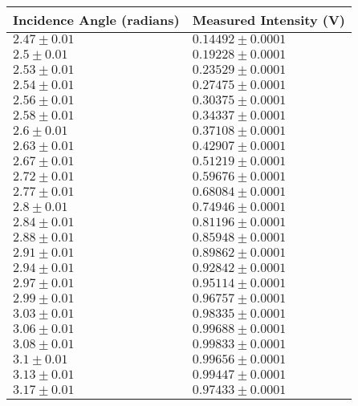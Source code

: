 \begin{tabular}{| p{} | p{} |}
\hline
Incidence Angle (radians) & Measured Intensity (V)\\
\hline
$2.47 \pm 0.01$ & $0.14492 \pm 0.0001$\\
$2.5 \pm 0.01$ & $0.19228 \pm 0.0001$\\
$2.53 \pm 0.01$ & $0.23529 \pm 0.0001$\\
$2.54 \pm 0.01$ & $0.27475 \pm 0.0001$\\
$2.56 \pm 0.01$ & $0.30375 \pm 0.0001$\\
$2.58 \pm 0.01$ & $0.34337 \pm 0.0001$\\
$2.6 \pm 0.01$ & $0.37108 \pm 0.0001$\\
$2.63 \pm 0.01$ & $0.42907 \pm 0.0001$\\
$2.67 \pm 0.01$ & $0.51219 \pm 0.0001$\\
$2.72 \pm 0.01$ & $0.59676 \pm 0.0001$\\
$2.77 \pm 0.01$ & $0.68084 \pm 0.0001$\\
$2.8 \pm 0.01$ & $0.74946 \pm 0.0001$\\
$2.84 \pm 0.01$ & $0.81196 \pm 0.0001$\\
$2.88 \pm 0.01$ & $0.85948 \pm 0.0001$\\
$2.91 \pm 0.01$ & $0.89862 \pm 0.0001$\\
$2.94 \pm 0.01$ & $0.92842 \pm 0.0001$\\
$2.97 \pm 0.01$ & $0.95114 \pm 0.0001$\\
$2.99 \pm 0.01$ & $0.96757 \pm 0.0001$\\
$3.03 \pm 0.01$ & $0.98335 \pm 0.0001$\\
$3.06 \pm 0.01$ & $0.99688 \pm 0.0001$\\
$3.08 \pm 0.01$ & $0.99833 \pm 0.0001$\\
$3.1 \pm 0.01$ & $0.99656 \pm 0.0001$\\
$3.13 \pm 0.01$ & $0.99447 \pm 0.0001$\\
$3.17 \pm 0.01$ & $0.97433 \pm 0.0001$\\
\hline
\end{tabular}